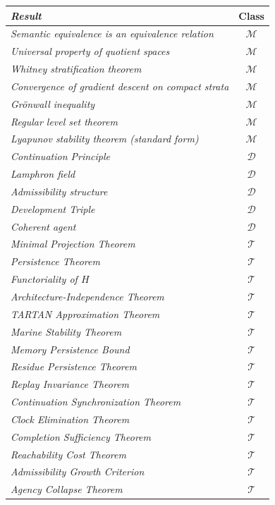 \documentclass[12pt, oneside]{book}
\theoremstyle{flyxion}
\theoremstyle{definition}
\begin{document}
\begin{center}
\renewcommand{\arraystretch}{1.4}
\begin{tabular}{>{\itshape}lc}
\toprule
Result & Class \\
\midrule
Semantic equivalence is an equivalence relation &
  $\mathcal{M}$ \\
Universal property of quotient spaces & $\mathcal{M}$ \\
Whitney stratification theorem & $\mathcal{M}$ \\
Convergence of gradient descent on compact strata &
  $\mathcal{M}$ \\
Gr\"onwall inequality & $\mathcal{M}$ \\
Regular level set theorem & $\mathcal{M}$ \\
Lyapunov stability theorem (standard form) &
  $\mathcal{M}$ \\
\midrule
Continuation Principle & $\mathcal{D}$ \\
Lamphron field & $\mathcal{D}$ \\
Admissibility structure & $\mathcal{D}$ \\
Development Triple & $\mathcal{D}$ \\
Coherent agent & $\mathcal{D}$ \\
\midrule
Minimal Projection Theorem & $\mathcal{T}$ \\
Persistence Theorem & $\mathcal{T}$ \\
Functoriality of $H$ & $\mathcal{T}$ \\
Architecture-Independence Theorem & $\mathcal{T}$ \\
TARTAN Approximation Theorem & $\mathcal{T}$ \\
Marine Stability Theorem & $\mathcal{T}$ \\
Memory Persistence Bound & $\mathcal{T}$ \\
Residue Persistence Theorem & $\mathcal{T}$ \\
Replay Invariance Theorem & $\mathcal{T}$ \\
Continuation Synchronization Theorem & $\mathcal{T}$ \\
Clock Elimination Theorem & $\mathcal{T}$ \\
Completion Sufficiency Theorem & $\mathcal{T}$ \\
Reachability Cost Theorem & $\mathcal{T}$ \\
Admissibility Growth Criterion & $\mathcal{T}$ \\
Agency Collapse Theorem & $\mathcal{T}$ \\

\end{tabular}
\end{center}
\end{document}
